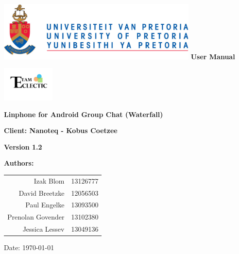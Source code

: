 \begin{titlepage}
\begin{flushright}

\includegraphics[width=380px]{../global/University_of_Pretoria_Logo.png}
\newline
\newline
\textbf {\LARGE User Manual} \newline


\centering\includegraphics[width=100px]{../global/Logo.jpg}


\textbf {\Large Linphone for Android Group Chat (Waterfall)}\newline

\textbf {\Large Client: Nanoteq - Kobus Coetzee}\newline

\textbf {\large Version 1.2}\newline

\centering \textbf {\large Authors:}

\begin{table}[H]
\large
\centering
\begin{tabular}{rl}
	Izak Blom & 13126777 \\
	David Breetzke & 12056503 \\
	Paul Engelke & 13093500 \\
	Prenolan Govender & 13102380 \\
	Jessica Lessev & 13049136 \\
\end{tabular}
\end{table}

Date: \today

\end{flushright}
\end{titlepage}